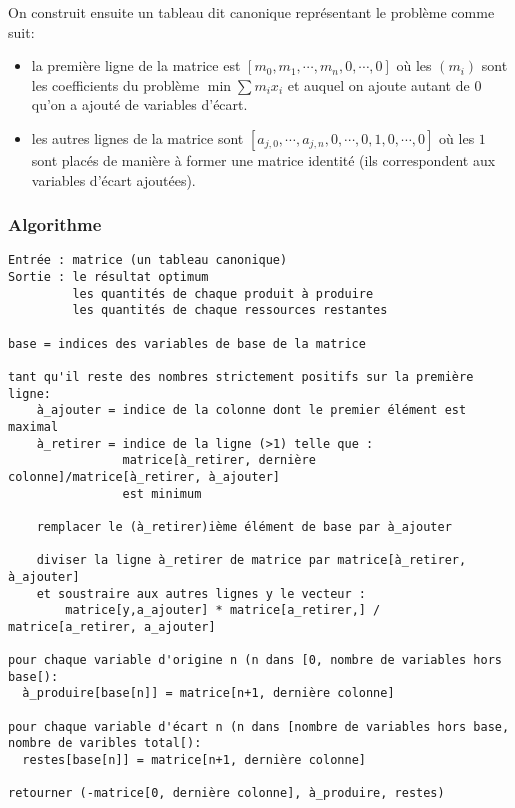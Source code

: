 \documentclass{scrartcl}
\begin{document}
      On construit ensuite un tableau dit canonique représentant le problème
      comme suit:
      \begin{itemize}
        \item la première ligne de la matrice est
          $[m_0, m_1, \cdots, m_n, 0, \cdots, 0]$ où les $(m_i)$ sont les
          coefficients du problème $\min \sum m_ix_i$ et auquel on ajoute
          autant de $0$ qu'on a ajouté de variables d'écart.
        \item les autres lignes de la matrice sont
          $[a_{j,0}, \cdots, a_{j,n}, 0, \cdots, 0, 1,0, \cdots, 0]$ où les $1$
          sont placés de manière à former une matrice identité (ils
          correspondent aux variables d'écart ajoutées).
      \end{itemize}

    \subsubsection{Algorithme}
      \begin{lstlisting}
Entrée : matrice (un tableau canonique)
Sortie : le résultat optimum
         les quantités de chaque produit à produire
         les quantités de chaque ressources restantes

base = indices des variables de base de la matrice

tant qu'il reste des nombres strictement positifs sur la première ligne:
    à_ajouter = indice de la colonne dont le premier élément est maximal
    à_retirer = indice de la ligne (>1) telle que :
                matrice[à_retirer, dernière colonne]/matrice[à_retirer, à_ajouter]
                est minimum

    remplacer le (à_retirer)ième élément de base par à_ajouter

    diviser la ligne à_retirer de matrice par matrice[à_retirer, à_ajouter]
    et soustraire aux autres lignes y le vecteur :
        matrice[y,a_ajouter] * matrice[a_retirer,] / matrice[a_retirer, a_ajouter]

pour chaque variable d'origine n (n dans [0, nombre de variables hors base[):
  à_produire[base[n]] = matrice[n+1, dernière colonne]

pour chaque variable d'écart n (n dans [nombre de variables hors base, nombre de varibles total[):
  restes[base[n]] = matrice[n+1, dernière colonne]

retourner (-matrice[0, dernière colonne], à_produire, restes)
      \end{lstlisting}
\end{document}
